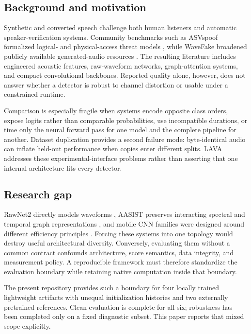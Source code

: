 \documentclass[10pt,journal,onecolumn]{IEEEtran}
\begin{document}
\subsection{Background and motivation}
Synthetic and converted speech challenge both human listeners and automatic speaker-verification systems. Community benchmarks such as ASVspoof formalized logical- and physical-access threat models \cite{wu2015asvspoof,kinnunen2017asvspoof,todisco2019asvspoof,yamagishi2021asvspoof,kinnunen2018tdcf}, while WaveFake broadened publicly available generated-audio resources \cite{frank2021wavefake}. The resulting literature includes engineered acoustic features, raw-waveform networks, graph-attention systems, and compact convolutional backbones. Reported quality alone, however, does not answer whether a detector is robust to channel distortion or usable under a constrained runtime.

Comparison is especially fragile when systems encode opposite class orders, expose logits rather than comparable probabilities, use incompatible durations, or time only the neural forward pass for one model and the complete pipeline for another. Dataset duplication provides a second failure mode: byte-identical audio can inflate held-out performance when copies enter different splits. LAVA addresses these experimental-interface problems rather than asserting that one internal architecture fits every detector.

\subsection{Research gap}
RawNet2 directly models waveforms \cite{tak2021rawnet2}, AASIST preserves interacting spectral and temporal graph representations \cite{jung2022aasist}, and mobile CNN families were designed around different efficiency principles \cite{howard2019mobilenetv3,sandler2018mobilenetv2,zhang2018shufflenet,ma2018shufflenetv2,tan2019efficientnet,tan2019mnasnet}. Forcing these systems into one topology would destroy useful architectural diversity. Conversely, evaluating them without a common contract confounds architecture, score semantics, data integrity, and measurement policy. A reproducible framework must therefore standardize the evaluation boundary while retaining native computation inside that boundary.

The present repository provides such a boundary for four locally trained lightweight artifacts with unequal initialization histories and two externally pretrained references. Clean evaluation is complete for all six; robustness has been completed only on a fixed diagnostic subset. This paper reports that mixed scope explicitly.
\end{document}

